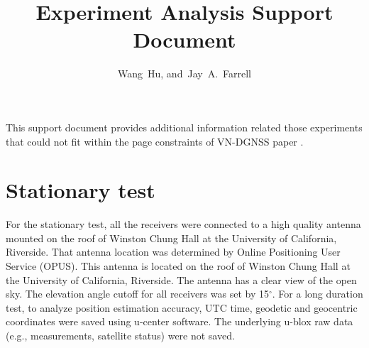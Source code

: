 \documentclass[letterpaper, 10 pt,onecolumn]{article}
\begin{document}
	\title{Experiment Analysis Support Document}
	\author{Wang~Hu,
		and~Jay~A.~Farrell
	}
	\maketitle
	

	This support document provides additional information related those experiments that could not fit within the page constraints of VN-DGNSS paper \cite{hu2021using}.
	
	\section{Stationary test}
	For the stationary test, all the receivers were connected to a high quality antenna mounted on the roof of Winston Chung Hall at the University of California, Riverside. That antenna location was determined by Online Positioning User Service (OPUS). This antenna is located on the roof of Winston Chung Hall at the University of California, Riverside. The antenna has a clear view of the open sky. The elevation angle cutoff for all receivers was set by 15$^\circ$. For a long duration test, to analyze position estimation accuracy, UTC time, geodetic and geocentric coordinates were saved using u-center software. The underlying u-blox raw data (e.g., measurements, satellite status) were not saved.

	
\end{document}

